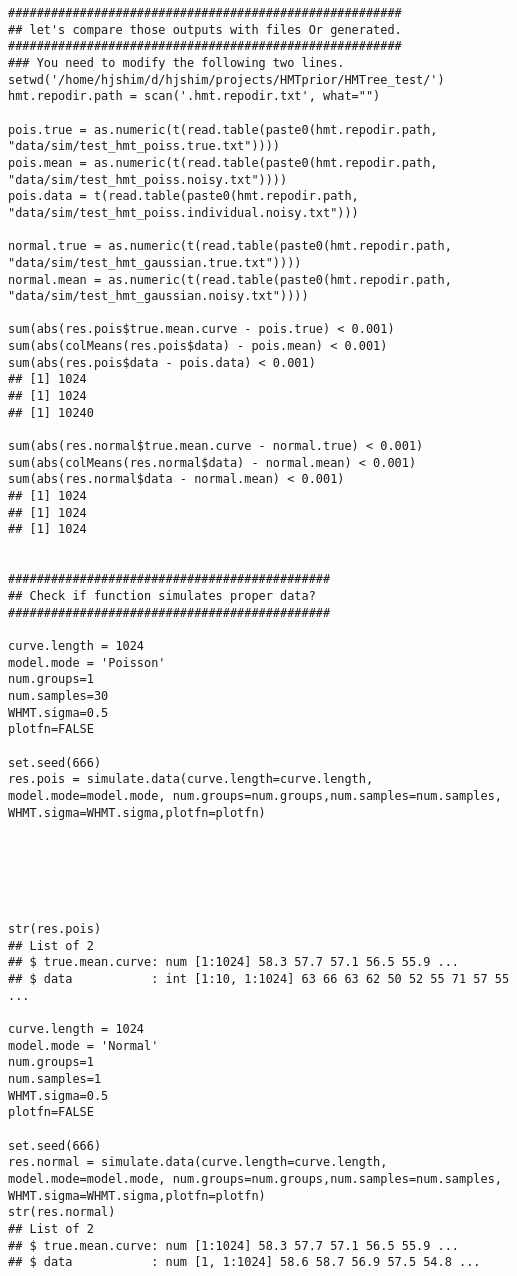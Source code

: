 \documentclass[11pt]{article}
\begin{document}
\begin{lstlisting}
#######################################################
## let's compare those outputs with files Or generated.
#######################################################
### You need to modify the following two lines.
setwd('/home/hjshim/d/hjshim/projects/HMTprior/HMTree_test/')
hmt.repodir.path = scan('.hmt.repodir.txt', what="")

pois.true = as.numeric(t(read.table(paste0(hmt.repodir.path, "data/sim/test_hmt_poiss.true.txt"))))
pois.mean = as.numeric(t(read.table(paste0(hmt.repodir.path, "data/sim/test_hmt_poiss.noisy.txt"))))
pois.data = t(read.table(paste0(hmt.repodir.path, "data/sim/test_hmt_poiss.individual.noisy.txt")))

normal.true = as.numeric(t(read.table(paste0(hmt.repodir.path, "data/sim/test_hmt_gaussian.true.txt"))))
normal.mean = as.numeric(t(read.table(paste0(hmt.repodir.path, "data/sim/test_hmt_gaussian.noisy.txt"))))

sum(abs(res.pois$true.mean.curve - pois.true) < 0.001)
sum(abs(colMeans(res.pois$data) - pois.mean) < 0.001)
sum(abs(res.pois$data - pois.data) < 0.001)
## [1] 1024
## [1] 1024
## [1] 10240

sum(abs(res.normal$true.mean.curve - normal.true) < 0.001)
sum(abs(colMeans(res.normal$data) - normal.mean) < 0.001)
sum(abs(res.normal$data - normal.mean) < 0.001)
## [1] 1024
## [1] 1024
## [1] 1024


#############################################
## Check if function simulates proper data?
#############################################

curve.length = 1024
model.mode = 'Poisson' 
num.groups=1
num.samples=30
WHMT.sigma=0.5
plotfn=FALSE

set.seed(666)
res.pois = simulate.data(curve.length=curve.length, model.mode=model.mode, num.groups=num.groups,num.samples=num.samples, WHMT.sigma=WHMT.sigma,plotfn=plotfn)






str(res.pois)
## List of 2
## $ true.mean.curve: num [1:1024] 58.3 57.7 57.1 56.5 55.9 ...
## $ data           : int [1:10, 1:1024] 63 66 63 62 50 52 55 71 57 55 ...

curve.length = 1024
model.mode = 'Normal' 
num.groups=1
num.samples=1
WHMT.sigma=0.5
plotfn=FALSE
 
set.seed(666) 
res.normal = simulate.data(curve.length=curve.length, model.mode=model.mode, num.groups=num.groups,num.samples=num.samples, WHMT.sigma=WHMT.sigma,plotfn=plotfn)
str(res.normal)
## List of 2
## $ true.mean.curve: num [1:1024] 58.3 57.7 57.1 56.5 55.9 ...
## $ data           : num [1, 1:1024] 58.6 58.7 56.9 57.5 54.8 ...
\end{lstlisting}
\end{document}
